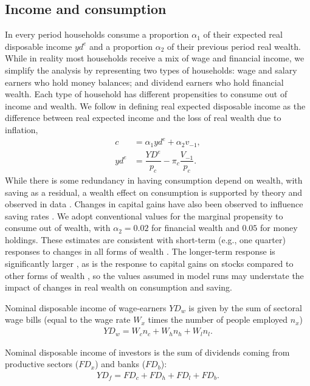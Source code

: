 \documentclass[authoryear]{article}
\begin{document}
\subsection{Income and consumption}
\label{sec:income}

In every period households consume a proportion $\alpha_1$ of their expected real disposable income $yd^e$ and a proportion $\alpha_2$ of their previous period real wealth. While in reality most households receive a mix of wage and financial income, we simplify the analysis by representing two types of households: wage and salary earners who hold money balances; and dividend earners who hold financial wealth. Each type of household has different propensities to consume out of income and wealth. We follow \citet{Godley:2007} in defining real expected disposable income as the difference between real expected income and the loss of real wealth due to inflation,
\begin{align}
c&=\alpha_1 yd^e + \alpha_2 v_{-1},\\
yd^e&=\dfrac{YD^e}{p_c}-\pi_c \dfrac{V_{-1}}{p_c}.
\end{align}
While there is some redundancy in having consumption depend on wealth, with saving as a residual, a wealth effect on consumption is supported by theory and observed in data \citet{poterba_stock_2000}. Changes in capital gains have also been observed to influence saving rates \citet{juster_decline_2006}. We adopt conventional values for the marginal propensity to consume out of wealth, with $\alpha_2 = 0.02$ for financial wealth and $0.05$ for money holdings. These estimates are consistent with short-term (e.g., one quarter) responses to changes in all forms of wealth \citet{poterba_stock_2000}. The longer-term response is significantly larger \citet{carroll_how_2011}, as is the response to capital gains on stocks compared to other forms of wealth \citet{juster_decline_2006}, so the values assumed in model runs may understate the impact of changes in real wealth on consumption and saving.

Nominal disposable income of wage-earners $YD_w$ is given by the sum of sectoral wage bills (equal to the wage rate $W_x$ times the number of people employed $n_x$)
\begin{align}
YD_w=W_c n_c+ W_h n_h+W_l n_l.
\end{align}

Nominal disposable income of investors is the sum of dividends coming from productive sectors ($FD_x$) and banks ($FD_b$):
\begin{align}
YD_f=FD_c+FD_h+FD_l+FD_b.
\end{align}
\end{document}
